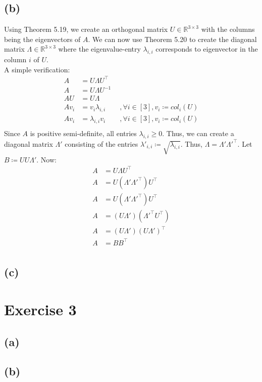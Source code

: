 \documentclass[12pt]{article}
\begin{document}
\subsection*{(b)}
Using Theorem 5.19, we create an orthogonal matrix $U \in \mathbb{R}^{3 \times 3}$ with the columns being the eigenvectors of $A$. We can now use Theorem 5.20 to create the diagonal matrix $\Lambda \in \mathbb{R}^{3 \times 3}$ where the eigenvalue-entry $\lambda_{i,i}$ corresponds to eigenvector in the column $i$ of $U$. \\
A simple verification:
\begin{align*}
	A &= U \Lambda U^\top \\
	A &= U \Lambda U^{-1} \\
	A U &= U \Lambda \\
	A v_i &= v_i \lambda_{i,i} \qquad, \forall i \in \left[3\right], v_i \coloneqq col_i(U) \\
	A v_i &= \lambda_{i,i} v_i \qquad, \forall i \in \left[3\right], v_i \coloneqq col_i(U) \\
\end{align*}
Since $A$ is positive semi-definite, all entries $\lambda_{i,i} \geq 0$. Thus, we can create a diagonal matrix $\Lambda'$ consisting of the entries $\lambda'_{i,i} \coloneqq \sqrt{\lambda_{i,i}}$. Thus, $\Lambda = \Lambda' \Lambda'^\top$. Let $B \coloneqq U U \Lambda'$. Now:
\begin{align*}
	A &= U \Lambda U^\top \\
	A &= U (\Lambda' \Lambda'^\top) U^\top \\
	A &= U (\Lambda' \Lambda'^\top) U^\top \\
	A &= (U \Lambda') (\Lambda'^\top U^\top) \\
	A &= (U \Lambda') (U \Lambda')^\top \\
	A &= B B^\top \\
\end{align*}

\subsection*{(c)}

\section*{Exercise 3}
\subsection*{(a)}
\subsection*{(b)}
\end{document}
